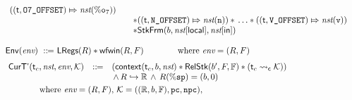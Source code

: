\begin{figure}[!t]
\[\begin{array}{l}
\begin{array}{lll}
                (\relmsto{(\thrdid, \ofsOEig)}{\nst(\oreg{7})}) \\
                & & 
                \sepstar 
                (\relmsto{(\thrdid, \ofsN)}{\nst(\regn)}) \sepstar \, \dots 
                \sepstar (\relmsto{(\thrdid, \ofsV)}{\nst(\regv)}) \\
                & & 
                \sepstar \RelStkFm{\block}{\nst[\localRN]}{\nst[\inRN]}
            \end{array}
            \\
            \\
            \Env{\env} \ \define \ 
                \LRegs{\RFile} \sepstar 
                \wfwin{\RFile}{\Wstack} \qquad \qquad 
                \text{where} \ \env = (\RFile, \Wstack)
                \\
            \\[-5pt]
            \hspace*{-0.15em}
            \begin{array}{lll}
                \RelCurTAux{\thrdid_c}{\nst}{\env}{\hthrdlocalst} & \define &
                (\relcontext{\thrdid_c}{\block}{\nst} \sepstar 
                \RelStk{\block'}{\Wstack}{\hWstk} \sepstar (\astCurCont{\thrdid_c}{\hthrdlocalst})) \\
                & & \, \land \, 
                \Rinj{\RFile}{\hRfile}
                \, \land \,  
                \RFile(\spreg) = (\block, 0)
            \end{array}
            \\
            \\[-9pt]
            \qquad\qquad
            \text{where} \ \env = (\RFile, \Wstack), \, 
            \hthrdlocalst = ((\hRfile, \block, \hWstk), \pc, \npc), 

\end{array}\]
\end{figure}

